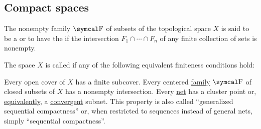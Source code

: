 \subsection{Compact spaces}\label{subsec:compact_spaces}

\begin{Definition}\label{def:centered_family}\cite[123]{Engelking1989}
  The nonempty family \( \CF \) of subsets of the topological space \( X \) is said to be a  or to have the  if the intersection \( F_1 \cap \cdots \cap F_n \) of any finite collection of sets is nonempty.
\end{Definition}

\begin{Definition}\label{def:compact_space}\cite[123]{Engelking1989}
  The space \( X \) is called  if any of the following equivalent finiteness conditions hold:
  \begin{DefEnum}
     Every open cover of \( X \) has a finite subcover.
     Every centered \hyperref[def:centered_family]{family} \( \CF \) of closed subsets of \( X \) has a nonempty intersection.
     Every \hyperref[def:topological_net]{net} has a cluster point or, \hyperref[thm:net_convergence_properties/cluster_point_iff_subnet_limit_point]{equivalently}, a \hyperref[def:net_convergence]{convergent} subnet. This property is also called \enquote{generalized sequential compactness} or, when restricted to sequences instead of general nets, simply \enquote{sequential compactness}.
  \end{DefEnum}
\end{Definition}
